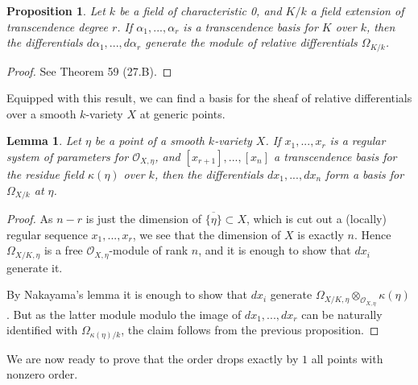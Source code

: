\documentclass[12pt,a4paper,leqno]{article}
\newcommand{\OO}{\mathcal{O}}
\theoremstyle{plain}
\newtheorem{lem}[theo]{Lemma}
\newtheorem{prop}[theo]{Proposition}
\theoremstyle{definition}
\theoremstyle{remark}
\begin{document}
\begin{prop}
Let $k$ be a field of characteristic 0, and $K/k$ a field extension of transcendence degree $r$. If $\alpha_1, ..., \alpha_r$ is a transcendence basis for $K$ over $k$, then the differentials $d \alpha_1,...,d \alpha_r$ generate the module of relative differentials $\Omega_{K/k}$.
\end{prop}
\begin{proof}
See \cite{Ma} Theorem 59 (27.B).
\end{proof}

Equipped with this result, we can find a basis for the sheaf of relative differentials over a smooth $k$-variety $X$ at generic points.

\begin{lem}
Let $\eta$ be a point of a smooth $k$-variety $X$. If $x_1,...,x_r$ is a regular system of parameters for $\OO_{X,\eta}$, and $[x_{r+1}],...,[x_n]$ a transcendence basis for the residue field $\kappa(\eta)$ over $k$, then the differentials $dx_1,...,dx_n$ form a basis for $\Omega_{X/k}$ at $\eta$.
\end{lem}
\begin{proof}
As $n-r$ is just the dimension of $\overline{\{\eta\}} \subset X$, which is cut out a (locally) regular sequence $x_1,...,x_r$, we see that the dimension of $X$ is exactly $n$. Hence $\Omega_{X/K,\eta}$ is a free $\OO_{X,\eta}$-module of rank $n$, and it is enough to show that $dx_i$ generate it.

By Nakayama's lemma it is enough to show that $dx_i$ generate $\Omega_{X/K,\eta} \otimes_{\OO_{X,\eta}} \kappa (\eta)$. But as the latter module modulo the image of $dx_1,...,dx_r$ can be naturally identified with $\Omega_{\kappa(\eta) /k}$, the claim follows from the previous proposition. 
\end{proof}

We are now ready to prove that the order drops exactly by $1$ all points with nonzero order.
\end{document}
